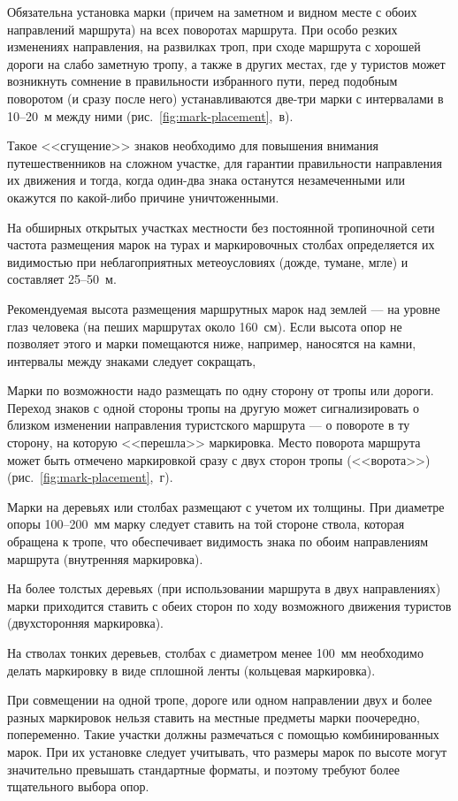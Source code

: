 \documentclass[a4paper,12pt]{extarticle}
\begin{document}
Обязательна установка марки (причем на заметном и видном месте с обоих направлений маршрута) на всех поворотах маршрута.
При особо резких изменениях направления, на развилках троп, при сходе маршрута с хорошей дороги на слабо заметную тропу,
а также в других местах, где у туристов может возникнуть сомнение в правильности избранного пути, перед подобным
поворотом (и сразу после него) устанавливаются две-три марки с интервалами в 10--20~м между ними (рис.~\ref{fig:mark-placement},~в).

Такое <<сгущение>> знаков необходимо для повышения внимания путешественников на сложном участке, для гарантии правильности
направления их движения и тогда, когда один-два знака останутся незамеченными или окажутся по какой-либо причине
уничтоженными.

На обширных открытых участках местности без постоянной тропиночной сети частота размещения марок на турах и
маркировочных столбах определяется их видимостью при неблагоприятных метеоусловиях (дожде, тумане, мгле) и составляет
25--50~м.

Рекомендуемая высота размещения маршрутных марок над землей --- на уровне глаз человека (на пеших маршрутах около 160~см).
Если высота опор не позволяет этого и марки помещаются ниже, например, наносятся на камни, интервалы между знаками
следует сокращать,

Марки по возможности надо размещать по одну сторону от тропы или дороги. Переход знаков с одной стороны тропы на другую
может сигнализировать о близком изменении направления туристского маршрута --- о повороте в ту сторону, на которую
<<перешла>> маркировка. Место поворота маршрута может быть отмечено маркировкой сразу с двух сторон тропы (<<ворота>>) (рис.~\ref{fig:mark-placement},~г).

Марки на деревьях или столбах размещают с учетом их толщины. При диаметре опоры 100--200~мм марку следует ставить на той
стороне ствола, которая обращена к тропе, что обеспечивает видимость знака по обоим направлениям маршрута (внутренняя
маркировка).

На более толстых деревьях (при использовании маршрута в двух направлениях) марки приходится ставить с обеих сторон по
ходу возможного движения туристов (двухсторонняя маркировка).

На стволах тонких деревьев, столбах с диаметром менее 100~мм необходимо делать маркировку в виде сплошной ленты
(кольцевая маркировка).

При совмещении на одной тропе, дороге или одном направлении двух и более разных маркировок нельзя ставить на местные
предметы марки поочередно, попеременно. Такие участки должны размечаться с помощью комбинированных марок. При их
установке следует учитывать, что размеры марок по высоте могут значительно превышать стандартные форматы, и поэтому
требуют более тщательного выбора опор.
\end{document}
